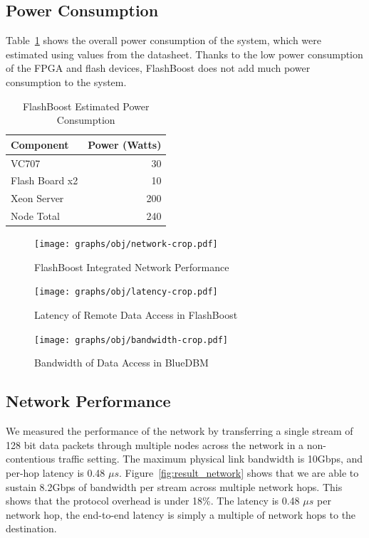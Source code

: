 \subsection{Power Consumption}
Table~\ref{tab:power} shows the overall power consumption of the system, which
were estimated using values from the datasheet. Thanks to the low power
consumption of the FPGA and flash devices, FlashBoost does not add much power
consumption to the system.

\begin{table}[h]\footnotesize
\centering
\begin{tabular}{l | r}
Component & Power (Watts) \\
\hline \hline
VC707 & 30 \\
Flash Board x2 & 10 \\
Xeon Server & 200 \\
\hline
Node Total & 240 \\

\end{tabular}
\caption{FlashBoost Estimated Power Consumption}
\label{tab:power}
\end{table}

\begin{figure}[ht]
\centering
\vspace{0pt}
\begin{minipage}[c]{.3\textwidth}
	\texttt{[image: graphs/obj/network-crop.pdf]}
	\caption{FlashBoost Integrated Network Performance}
	\label{fig:result_network}
\end{minipage}\hfill
\vspace{0pt}
\begin{minipage}[c]{.3\textwidth}
	\texttt{[image: graphs/obj/latency-crop.pdf]}
	\caption{Latency of Remote Data Access in FlashBoost}
	\label{fig:result_latency}
\end{minipage}\hfill
\vspace{0pt}
\begin{minipage}[c]{.3\textwidth}
	\texttt{[image: graphs/obj/bandwidth-crop.pdf]}
	\caption{Bandwidth of Data Access in BlueDBM}
	\label{fig:result_bandwidth}
\end{minipage}
\end{figure}

\subsection{Network Performance}

We measured the performance of the network by transferring a single stream of 128 bit data packets through multiple nodes across the network in a non-contentious traffic setting. The maximum physical link bandwidth is 10Gbps, and per-hop latency is 0.48 $\mu s$.
Figure~\ref{fig:result_network} shows that we are able to sustain 8.2Gbps of bandwidth per stream across multiple network hops. This shows that the protocol overhead is under 18\%. The latency is 0.48 $\mu s$ per network hop, the end-to-end latency is simply a multiple of network hops to the destination. 

